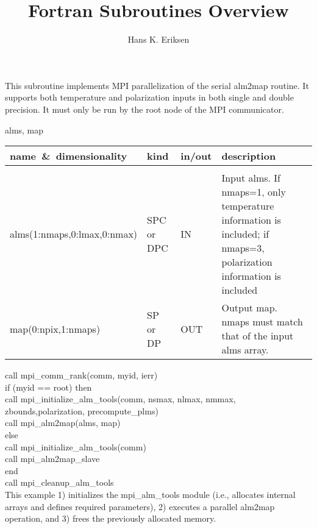 
\sloppy


\title{\healpix Fortran Subroutines Overview}
 \section[mpi\_alm2map*]{ }
\label{sub:mpi_alm2map}
\author{Hans K. Eriksen}

\begin{facility}
{This subroutine implements MPI parallelization of the serial alm2map
routine. It supports both temperature and polarization inputs in both
single and double precision. It must only be run by the root node of
the MPI communicator.
}
{\modMpiAlmTools}
\end{facility}

\begin{f90format}
{alms, map}
\end{f90format}

\begin{arguments}
{
\begin{tabular}{p{0.4\hsize} p{0.05\hsize} p{0.05\hsize} p{0.40\hsize}} \hline  
\textbf{name~\&~dimensionality} & \textbf{kind} & \textbf{in/out} & \textbf{description} \\ \hline
                   &   &   &                           \\ %
alms(1:nmaps,0:lmax,0:nmax) & SPC or DPC & IN & Input alms. If
nmaps=1, only temperature information is included; if nmaps=3,
polarization information is included \\ 
map(0:npix,1:nmaps) & SP or DP & OUT & Output map. nmaps must match 
that of the input alms array.\\
\end{tabular}
}
\end{arguments}

\begin{example}
{
call mpi\_comm\_rank(comm, myid, ierr)\\
if (myid == root) then\\
\hspace*{1cm}call mpi\_initialize\_alm\_tools(comm, nsmax, nlmax, nmmax, \\
\hspace*{3cm}zbounds,polarization, precompute\_plms)\\
\hspace*{1cm}call mpi\_alm2map(alms, map)\\
else \\
\hspace*{1cm}call mpi\_initialize\_alm\_tools(comm)\\
\hspace*{1cm}call mpi\_alm2map\_slave\\
end\\
call mpi\_cleanup\_alm\_tools\\
}
{
This example 1) initializes the mpi\_alm\_tools module (i.e.,
allocates internal arrays and defines required parameters), 2)
executes a parallel alm2map operation, and 3) frees the previously
allocated memory.
}
\end{example}

